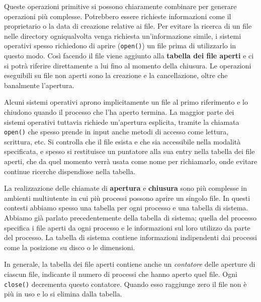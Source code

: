         Queste operazioni primitive si possono chiaramente combinare per generare operazioni più complesse. Potrebbero essere richieste informazioni come il proprietario o la data di creazione relative ai file. Per evitare la ricerca di un file nelle directory ogniqualvolta venga richiesta un'informazione simile, i sistemi operativi spesso richiedono di aprire (\texttt{open()}) un file prima di utilizzarlo in questo modo. Così facendo il file viene aggiunto alla \textbf{tabella dei file aperti} e ci si potrà riferire direttamente a lui fino al momento della chiusura. Le operazioni eseguibili su file non aperti sono la creazione e la cancellazione, oltre che banalmente l'apertura.
        
        Alcuni sistemi operativi aprono implicitamente un file al primo riferimento e lo chiudono quando il processo che l'ha aperto termina. La maggior parte dei sistemi operativi tuttavia richiede un'apertura esplicita, tramite la chiamata \texttt{open()} che spesso prende in input anche metodi di accesso come lettura, scrittura, etc. Si controlla che il file esista e che sia accessibile nella modalità specificata, e spesso si restituisce un puntatore alla sua entry nella tabella dei file aperti, che da quel momento verrà usata come nome per richiamarlo, onde evitare continue ricerche dispendiose nella tabella.
        
        La realizzazione delle chiamate di \textbf{apertura} e \textbf{chiusura} sono più complesse in ambienti multiutente in cui più processi possono aprire un singolo file. In questi contesti abbiamo spesso una tabella per ogni processo e una tabella di sistema. Abbiamo già parlato precedentemente della tabella di sistema; quella del processo specifica i file aperti da ogni processo e le informazioni sul loro utilizzo da parte del processo. La tabella di sistema contiene informazioni indipendenti dai processi come la posizione su disco o le dimensioni.
        
        In generale, la tabella dei file aperti contiene anche un \textit{contatore} delle aperture di ciascun file, indicante il numero di processi che hanno aperto quel file. Ogni \texttt{close()} decrementa questo contatore. Quando esso raggiunge zero il file non è più in uso e lo si elimina dalla tabella.
        
